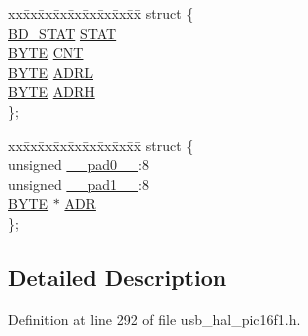 \begin{DoxyCompactItemize}
\begin{tabbing}
\end{tabbing}\item 
\begin{tabbing}
xx\=xx\=xx\=xx\=xx\=xx\=xx\=xx\=xx\=\kill
struct \{\\
\>\hyperlink{usb__hal__pic16f1_8h_a669828f95c5a1f57f02f0a5481368db6}{BD\_STAT} \hyperlink{union_____b_d_t_ac3cab1502caf8390e8ec18cba01f2f09}{STAT}\\
\>\hyperlink{_generic_type_defs_8h_a4ae1dab0fb4b072a66584546209e7d58}{BYTE} \hyperlink{union_____b_d_t_aa47496fdbb315cdb40ee4b6a18fe21c4}{CNT}\\
\>\hyperlink{_generic_type_defs_8h_a4ae1dab0fb4b072a66584546209e7d58}{BYTE} \hyperlink{union_____b_d_t_aed7cec86ac74d18c84b2a992136bd01d}{ADRL}\\
\>\hyperlink{_generic_type_defs_8h_a4ae1dab0fb4b072a66584546209e7d58}{BYTE} \hyperlink{union_____b_d_t_a6a7af362f9570b9847cb9df593fe49d3}{ADRH}\\
\}; \\

\end{tabbing}\item 
\begin{tabbing}
xx\=xx\=xx\=xx\=xx\=xx\=xx\=xx\=xx\=\kill
struct \{\\
\>unsigned \hyperlink{union_____b_d_t_adf71f3d8410c1f1dbbc96680a92c49af}{\_\_pad0\_\_}:8\\
\>unsigned \hyperlink{union_____b_d_t_acaf2d0924a107ec6e8d2e31febaf66f9}{\_\_pad1\_\_}:8\\
\>\hyperlink{_generic_type_defs_8h_a4ae1dab0fb4b072a66584546209e7d58}{BYTE} $\ast$ \hyperlink{union_____b_d_t_af72689b61b0108586139eb99c10aa22e}{ADR}\\
\}; \\

\end{tabbing}\end{DoxyCompactItemize}


\subsection{Detailed Description}


Definition at line 292 of file usb\+\_\+hal\+\_\+pic16f1.\+h.



